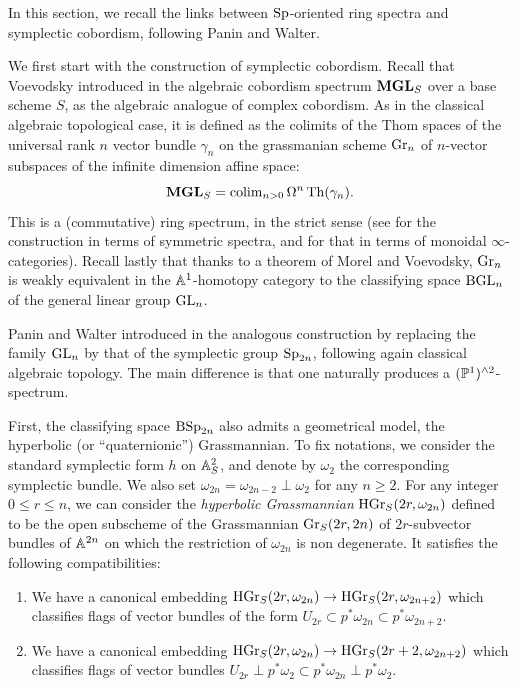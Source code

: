 \begin{num}\label{num:sp-grassmanian}
In this section, we recall the links between $\Sp$-oriented ring spectra and symplectic cobordism, following Panin and Walter.

We first start with the construction of symplectic cobordism.
 Recall that Voevodsky introduced in \cite{VoeMilnor} the algebraic cobordism spectrum $\MGL_S$
 over a base scheme $S$, as the algebraic analogue of complex cobordism.
 As in the classical algebraic topological case,
 it is defined as the colimits of the Thom spaces of the universal rank $n$ vector bundle
 $\gamma_n$ on the grassmanian scheme $\Gr_n$ of $n$-vector subspaces of the infinite dimension affine
 space:
$$
\MGL_S=\colim_{n>0} \Omega^n \Th(\gamma_n).
$$
This is a (commutative) ring spectrum, in the strict sense
 (see \cite{PPR} for the construction in terms of symmetric spectra,
 and \cite[]{BH} for that in terms of monoidal $\infty$-categories).
 Recall lastly that thanks to a theorem of Morel and Voevodsky,
 $\Gr_n$ is weakly equivalent in the $\AA^1$-homotopy category to the classifying space $\BGL_n$
 of the general linear group $\GL_n$.

Panin and Walter introduced in \cite{PWcobord} the analogous construction
 by replacing the family $\GL_n$ by that of the symplectic group $\Sp_{2n}$,
 following again classical algebraic topology. The main difference is that
 one naturally produces a $(\PP^1)^{\wedge 2}$-spectrum.

First, the classifying space $\BSp_{2n}$ also admits a geometrical model,
 the hyperbolic (or ``quaternionic'') Grassmannian.
 To fix notations, we consider the standard symplectic form $h$ on $\AA^2_S$,
 and denote by $\omega_2$ the corresponding symplectic bundle.
 We also set $\omega_{2n}=\omega_{2n-2}\perp \omega_2$ for any $n\geq 2$.
 For any integer $0\leq r\leq n$, we can consider the \emph{hyperbolic Grassmannian} $\HGr_S(2r,\omega_{2n})$ defined to be the open subscheme of the Grassmannian $\Gr_S(2r,2n)$ of $2r$-subvector bundles of $\AA^{2n}$
 on which the restriction of $\omega_{2n}$ is non degenerate.
 It satisfies the following compatibilities:
\begin{enumerate}
\item We have a canonical embedding $\HGr_S(2r,\omega_{2n})\to \HGr_S(2r,\omega_{2n+2})$
 which classifies flags of vector bundles of the form $U_{2r}\subset p^*\omega_{2n}\subset  p^*\omega_{2n+2}$.
\item We have a canonical embedding $\HGr_S(2r,\omega_{2n})\to \HGr_S(2r+2,\omega_{2n+2})$ which classifies flags of vector bundles
 $U_{2r}\perp p^*\omega_2\subset p^*\omega_{2n}\perp p^*\omega_{2}$.
\end{enumerate}


\end{num}
